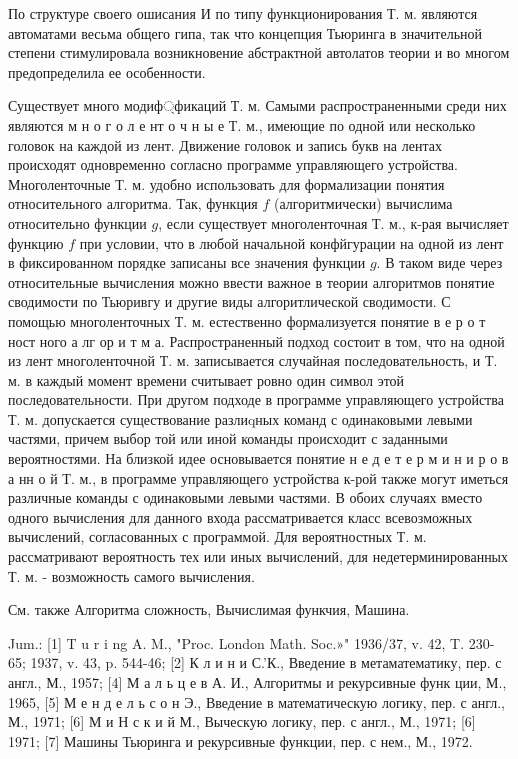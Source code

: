 \documentclass[10pt]{article}
\begin{document}
По структуре своего ошисания И по типу функционирования Т. м. являются автоматами весьма общего гипа, так что концепция Тьюринга в значительной степени стимулировала возникновение абстрактной автолатов теории и во многом предопределила ее особенности.



Существует много модиф্фикаций Т. м. Самыми распространенными среди них являются м н о г о л е нт о ч н ы е Т. м., имеющие по одной или несколько головок на каждой из лент. Движение головок и запись букв на лентах происходят одновременно согласно программе управляющего устройства. Многоленточные Т. м. удобно использовать для формализации понятия относительного алгоритма. Так, функция $f$ (алгоритмически) вычислима относительно функции $g$, если существует многоленточная Т. м., к-рая вычисляет функцию $f$ при условии, что в любой начальной конфйгурации на одной из лент в фиксированном порядке записаны все значения функции $g$. В таком виде через относительные вычисления можно ввести важное в теории алгоритмов понятие сводимости по Тьюривгу и другие виды алгоритлической сводимости. С помощью многоленточных Т. м. естественно формализуется понятие в е р о т ност ного а лг ор и т м а. Распространенный подход состоит в том, что на одной из лент многоленточной Т. м. записывается случайная последовательность, и Т. м. в каждый момент времени считывает ровно один символ этой последовательности. При другом подходе в программе управляющего устройства Т. м. допускается существование разлиqных команд с одинаковыми левыми частями, причем выбор той или иной команды происходит с заданными вероятностями. На близкой идее основывается понятие н е д е т е р м и н и р о в а нн о й Т. м., в программе управляющего устройства к-рой также могут иметься различные команды с одинаковыми левыми частями. В обоих случаях вместо одного вычисления для данного входа рассматривается класс всевозможных вычислений, согласованных с программой. Для вероятностных Т. м. рассматривают вероятность тех или иных вычислений, для недетерминированных Т. м. - возможность самого вычисления.



См. также Алгоритма сложность, Вычислимая функчия, Машина.



Jum.: [1] T u r i ng A. M., "Proc. London Math. Soc.»" 1936/37, v. 42, T. 230-65; 1937, v. 43, p. 544-46; [2] К л и н и С.'К., Введение в метаматематику, пер. с англ., М., 1957; [4] М а л ь ц е в А. И., Алгоритмы и рекурсивные функ ции, М., 1965, [5] М е н д е л ь с о н Э., Введение в математическую логику, пер. с англ., М., 1971; [6] М и Н с к и й М., Выческую логику, пер. с англ., М., 1971; [6] 1971; [7] Машины Тьюринга и рекурсивные функции, пер. с нем., М., 1972.
\end{document}
